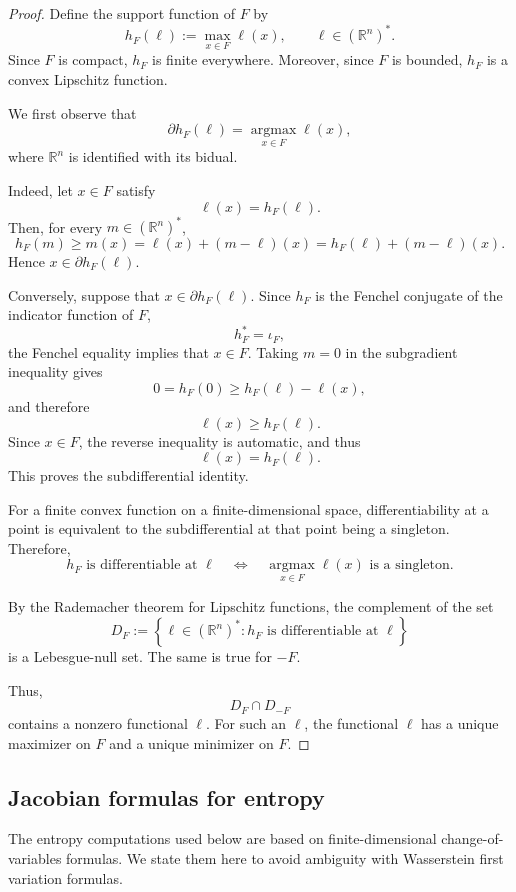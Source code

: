 \documentclass[a4paper,11pt]{article}
\numberwithin{equation}{section}
\newcommand{\argmax}{\operatorname*{argmax}}
\begin{document}
	\begin{proof}
		Define the support function of \(F\) by
		\[
		h_F(\ell):=\max_{x\in F}\ell(x),
		\qquad
		\ell\in (\mathbb{R}^n)^*.
		\]
		Since \(F\) is compact, \(h_F\) is finite everywhere. Moreover, since \(F\) is bounded, \(h_F\) is a convex Lipschitz function.
		
		We first observe that
		\[
		\partial h_F(\ell)
		=
		\argmax_{x\in F}\ell(x),
		\]
		where \(\mathbb{R}^n\) is identified with its bidual.
		
		Indeed, let \(x\in F\) satisfy
		\[
		\ell(x)=h_F(\ell).
		\]
		Then, for every \(m\in(\mathbb{R}^n)^*\),
		\[
		h_F(m)\geq m(x)
		=
		\ell(x)+(m-\ell)(x)
		=
		h_F(\ell)+(m-\ell)(x).
		\]
		Hence \(x\in\partial h_F(\ell)\).
		
		Conversely, suppose that \(x\in\partial h_F(\ell)\). Since \(h_F\) is the Fenchel conjugate of the indicator function of \(F\),
		\[
		h_F^*=\iota_F,
		\]
		the Fenchel equality implies that \(x\in F\). Taking \(m=0\) in the subgradient inequality gives
		\[
		0=h_F(0)
		\geq
		h_F(\ell)-\ell(x),
		\]
		and therefore
		\[
		\ell(x)\geq h_F(\ell).
		\]
		Since \(x\in F\), the reverse inequality is automatic, and thus
		\[
		\ell(x)=h_F(\ell).
		\]
		This proves the subdifferential identity.
		
		For a finite convex function on a finite-dimensional space, differentiability at a point is equivalent to the subdifferential at that point being a singleton. Therefore,
		\[
		h_F \text{ is differentiable at } \ell
		\quad\Longleftrightarrow\quad
		\argmax_{x\in F}\ell(x)
		\text{ is a singleton}.
		\]
		
		By the Rademacher theorem for Lipschitz functions, the complement of the set
		\[
		D_F
		:=
		\left\{
		\ell\in(\mathbb{R}^n)^*:
		h_F \text{ is differentiable at }\ell
		\right\}
		\]
		is a Lebesgue-null set. The same is true for \(-F\).
		
		Thus,
		\[
		D_F\cap D_{-F}
		\]
		contains a nonzero functional \(\ell\). For such an \(\ell\), the functional \(\ell\) has a unique maximizer on \(F\) and a unique minimizer on \(F\).
	\end{proof}
	
	
	
	\subsection{Jacobian formulas for entropy}\label{sec:entropy-jacobian}
	
	The entropy computations used below are based on finite-dimensional change-of-variables formulas. We state them here to avoid ambiguity with Wasserstein first variation formulas.
	
\end{document}
